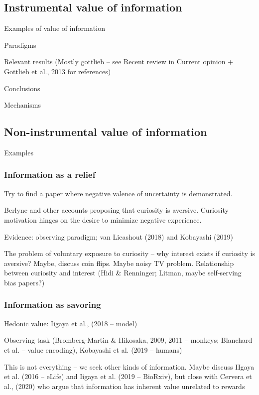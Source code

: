 \subsection{Instrumental value of information}

    Examples of value of information

    Paradigms

    Relevant results (Mostly gottlieb -- see Recent review in Current opinion + Gottlieb et al., 2013 for references)

    Conclusions

    Mechanisms

\subsection{Non-instrumental value of information}

    Examples

    \subsubsection{Information as a relief}

        Try to find a paper where negative valence of uncertainty is demonstrated.

        Berlyne and other accounts proposing that curiosity is aversive. Curiosity motivation hinges on the desire to minimize negative experience.

        Evidence: observing paradigm; van Lieashout (2018) and Kobayashi (2019)

        The problem of voluntary exposure to curiosity -- why interest exists if curiosity is aversive? Maybe, discuss coin flips. Maybe noisy TV problem. Relationship between curiosity and interest (Hidi & Renninger; Litman, maybe self-serving bias papers?)

    \subsubsection{Information as savoring}

        Hedonic value: Iigaya et al., (2018 -- model) 
            
            Observing task (Bromberg-Martin & Hikosaka, 2009, 2011 -- monkeys; Blanchard et al. -- value encoding), Kobayashi et al. (2019 -- humans)

            This is not everything -- we seek other kinds of information. Maybe discuss IIgaya et al. (2016 -- eLife) and Iigaya et al. (2019 -- BioRxiv), but close with Cervera et al., (2020) who argue that information has inherent value unrelated to rewards


